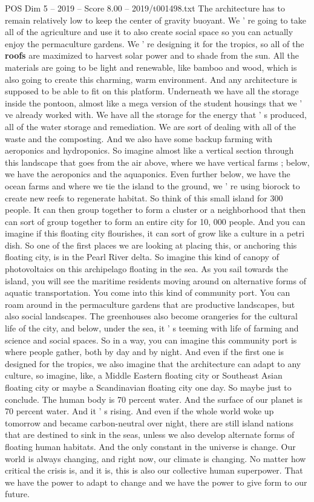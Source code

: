 \begin{textsample}{POS Dim 5 – 2019 – Score 8.00 – 2019/t001498.txt}
The architecture has to remain relatively low to keep the center of gravity buoyant.
We ' re going to take all of the agriculture and use it to also create social space so you can actually enjoy the permaculture gardens.
We ' re designing it for the tropics, so all of the \textbf{roofs} are maximized to harvest solar power and to shade from the sun.
All the materials are going to be light and renewable, like bamboo and wood, which is also going to create this charming, warm environment.
And any architecture is supposed to be able to fit on this platform.
Underneath we have all the storage inside the pontoon, almost like a mega version of the student housings that we ' ve already worked with.
We have all the storage for the energy that ' s produced, all of the water storage and remediation.
We are sort of dealing with all of the waste and the composting.
And we also have some backup farming with aeroponics and hydroponics.
So imagine almost like a vertical section through this landscape that goes from the air above, where we have vertical farms ; below, we have the aeroponics and the aquaponics.
Even further below, we have the ocean farms and where we tie the island to the ground, we ' re using biorock to create new reefs to regenerate habitat.
So think of this small island for 300 people.
It can then group together to form a cluster or a neighborhood that then can sort of group together to form an entire city for 10, 000 people.
And you can imagine if this floating city flourishes, it can sort of grow like a culture in a petri dish.
So one of the first places we are looking at placing this, or anchoring this floating city, is in the Pearl River delta.
So imagine this kind of canopy of photovoltaics on this archipelago floating in the sea.
As you sail towards the island, you will see the maritime residents moving around on alternative forms of aquatic transportation.
You come into this kind of community port.
You can roam around in the permaculture gardens that are productive landscapes, but also social landscapes.
The greenhouses also become orangeries for the cultural life of the city, and below, under the sea, it ' s teeming with life of farming and science and social spaces.
So in a way, you can imagine this community port is where people gather, both by day and by night.
And even if the first one is designed for the tropics, we also imagine that the architecture can adapt to any culture, so imagine, like, a Middle Eastern floating city or Southeast Asian floating city or maybe a Scandinavian floating city one day.
So maybe just to conclude.
The human body is 70 percent water.
And the surface of our planet is 70 percent water.
And it ' s rising.
And even if the whole world woke up tomorrow and became carbon-neutral over night, there are still island nations that are destined to sink in the seas, unless we also develop alternate forms of floating human habitats.
And the only constant in the universe is change.
Our world is always changing, and right now, our climate is changing.
No matter how critical the crisis is, and it is, this is also our collective human superpower.
That we have the power to adapt to change and we have the power to give form to our future.

\end{textsample}
